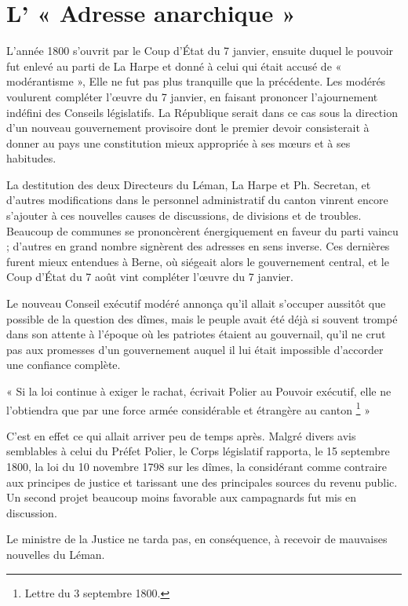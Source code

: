 \documentclass[french,twoside]{book} %
\newenvironment{quoteblock}%
  {\begin{quoting}}
  {\end{quoting}}
\newenvironment{quotebar}{%
    \def\FrameCommand{{\color{rubric!10!}\vrule width 0.5em} \hspace{0.9em}}%
    \def\OuterFrameSep{\itemsep} %
    \MakeFramed {\advance\hsize-\width \FrameRestore}
  }%
  {%
    \endMakeFramed
  }
\renewenvironment{quoteblock}%
  {%
    \savenotes
    \setstretch{0.9}
    \begin{quotebar}
  }
  {%
    \end{quotebar}
    \spewnotes
  }
\begin{document}
\section[L’ « Adresse anarchique »]{L’ « Adresse anarchique »}
\noindent L’année 1800 s’ouvrit par le Coup d’État du 7 janvier, ensuite duquel le pouvoir fut enlevé au parti de La Harpe et donné à celui qui était accusé de « modérantisme », Elle ne fut pas plus tranquille que la précédente. Les modérés voulurent compléter l’œuvre du 7 janvier, en faisant prononcer l’ajournement indéfini des Conseils législatifs. La République serait dans ce cas sous la direction d’un nouveau gouvernement provisoire dont le premier devoir consisterait à donner au pays une constitution mieux appropriée à ses mœurs et à ses habitudes.\par
La destitution des deux Directeurs du Léman, La Harpe et Ph. Secretan, et d’autres modifications dans le personnel administratif du canton vinrent encore s’ajouter à ces nouvelles causes de discussions, de divisions et de troubles. Beaucoup de communes se prononcèrent énergiquement en faveur du parti vaincu ; d’autres en grand nombre signèrent des adresses en sens inverse. Ces dernières furent mieux entendues à Berne, où siégeait alors le gouvernement central, et le Coup d’État du 7 août vint compléter l’œuvre du 7 janvier.\par
Le nouveau Conseil exécutif modéré annonça qu’il allait s’occuper aussitôt que possible de la question des dîmes, mais le peuple avait été déjà si souvent trompé dans son attente à l’époque où les patriotes étaient au gouvernail, qu’il ne crut pas aux promesses d’un gouvernement auquel il lui était impossible d’accorder une confiance complète.\par

\begin{quoteblock}
 \noindent « Si la loi continue à exiger le rachat, écrivait Polier au Pouvoir exécutif, elle ne l’obtiendra que par une force armée considérable et étrangère au canton \footnote{Lettre du 3 septembre 1800.} »
 \end{quoteblock}

\noindent C’est en effet ce qui allait arriver peu de temps après. Malgré divers avis semblables à celui du Préfet Polier, le Corps législatif rapporta, le 15 septembre 1800, la loi du 10 novembre 1798 sur les dîmes, la considérant comme contraire aux principes de justice et tarissant une des principales sources du revenu public. Un second projet beaucoup moins favorable aux campagnards fut mis en discussion.\par
Le ministre de la Justice ne tarda pas, en conséquence, à recevoir de mauvaises nouvelles du Léman.\par
\end{document}
